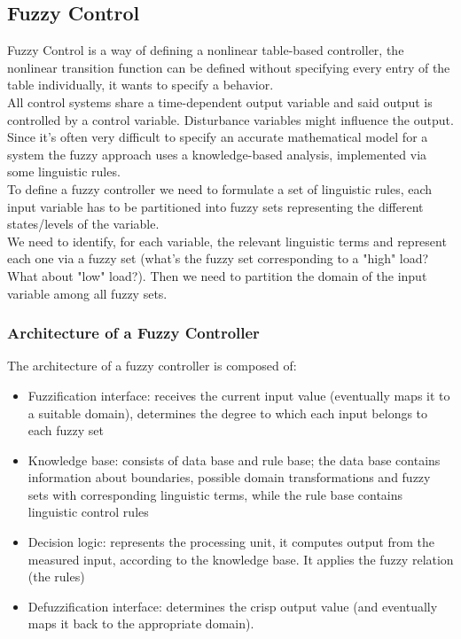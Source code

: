 \subsection{Fuzzy Control}

Fuzzy Control is a way of defining a nonlinear table-based controller, the nonlinear transition function can be defined without specifying every entry of the table individually, it wants to specify a behavior.\\
All control systems share a time-dependent output variable and said output is controlled by a control variable. Disturbance variables might influence the output.\\

Since it's often very difficult to specify an accurate mathematical model for a system the fuzzy approach uses a knowledge-based analysis, implemented via some linguistic rules.\\
To define a fuzzy controller we need to formulate a set of linguistic rules, each input variable has to be partitioned into fuzzy sets representing the different states/levels of the variable. \\
We need to identify, for each variable, the relevant linguistic terms and represent each one via a fuzzy set (what's the fuzzy set corresponding to a "high" load? What about "low" load?). Then we need to partition the domain of the input variable among all fuzzy sets.\\

\subsubsection{Architecture of a Fuzzy Controller}
The architecture of a fuzzy controller is composed of: 
\begin{itemize}
	\item Fuzzification interface: receives the current input value (eventually maps it to a suitable domain), determines the degree to which each input belongs to each fuzzy set
	\item Knowledge base: consists of data base and rule base; the data base contains information about boundaries, possible domain transformations and fuzzy sets with corresponding linguistic terms, while the rule base contains linguistic control rules
	\item Decision logic: represents the processing unit, it computes output from the measured input, according to the knowledge base. It applies the fuzzy relation (the rules)
	\item Defuzzification interface: determines the crisp output value (and eventually maps it back to the appropriate domain).
\end{itemize}

